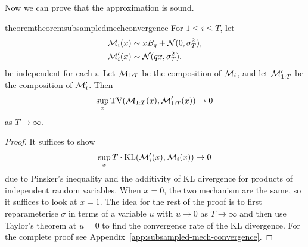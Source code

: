 \documentclass{article}
\theoremstyle{plain}
\theoremstyle{definition}
\theoremstyle{remark}
\begin{document}
Now we can prove that the approximation is sound.
\begin{restatable}{theorem}{theoremsubsampledmechconvergence}\label{thm:subsampled-mech-convergence}
    For $1 \leq i \leq T$, let 
    \begin{align}
        \mathcal{M}_i(x) &\sim xB_q + \mathcal{N}(0, \sigma_T^2), \label{eq:simple-setting-mog}\\
        \mathcal{M}_i'(x) &\sim \mathcal{N}(qx, \sigma_T^2).
    \end{align}
    be independent for each $i$. Let $\mathcal{M}_{1:T}$ be the composition
    of $\mathcal{M}_i$, and let $\mathcal{M}_{1:T}'$ be the composition of $\mathcal{M}'_i$.
    Then
    \begin{equation}
        \sup_x \mathrm{TV}(\mathcal{M}_{1:T}(x), \mathcal{M}_{1:T}'(x)) \to 0
    \end{equation}
    as $T\to \infty$.
\end{restatable}
\begin{proof}
    It suffices to show
    \begin{equation}
        \sup_x T\cdot \mathrm{KL}(\mathcal{M}_i'(x), \mathcal{M}_i(x)) \to 0
    \end{equation}
    due to Pinsker's inequality and the additivity of KL divergence for products of independent
    random variables. When $x = 0$, the two mechanism are the same, so it suffices to 
    look at $x = 1$. The idea for the rest of the proof is to first reparameterise 
    $\sigma$ in terms of a variable $u$ with $u \to 0$ as $T\to \infty$ and then 
    use Taylor's theorem at $u = 0$ to find the convergence rate of the KL divergence.
    For the complete proof see Appendix~\ref{app:subsampled-mech-convergence}.
\end{proof}
\end{document}
